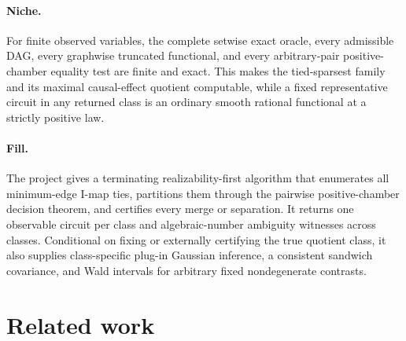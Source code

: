 \documentclass{article}
\begin{document}
\paragraph{Niche.} For finite observed variables, the complete setwise exact oracle, every admissible DAG, every graphwise truncated functional, and every arbitrary-pair positive-chamber equality test are finite and exact. This makes the tied-sparsest family and its maximal causal-effect quotient computable, while a fixed representative circuit in any returned class is an ordinary smooth rational functional at a strictly positive law.

\paragraph{Fill.} The project gives a terminating realizability-first algorithm that enumerates all minimum-edge I-map ties, partitions them through the pairwise positive-chamber decision theorem, and certifies every merge or separation. It returns one observable circuit per class and algebraic-number ambiguity witnesses across classes. Conditional on fixing or externally certifying the true quotient class, it also supplies class-specific plug-in Gaussian inference, a consistent sandwich covariance, and Wald intervals for arbitrary fixed nondegenerate contrasts.

\section{Related work}
\end{document}
